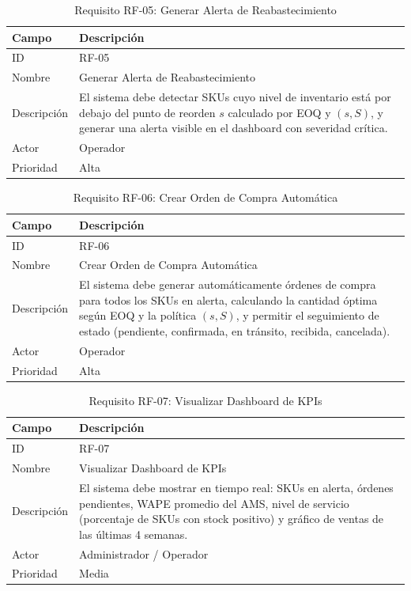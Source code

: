 \documentclass[12pt, a4paper]{report}
\begin{document}
\begin{table}[H]
  \centering
  \caption{Requisito RF-05: Generar Alerta de Reabastecimiento}
  \label{tab:rf05}
  \begin{tabular}{|l|p{9cm}|}
    \hline
    \textbf{Campo} & \textbf{Descripción} \\
    \hline
    ID          & RF-05 \\
    Nombre      & Generar Alerta de Reabastecimiento \\
    Descripción & El sistema debe detectar SKUs cuyo nivel de inventario está por
                  debajo del punto de reorden $s$ calculado por EOQ y $(s,S)$, y
                  generar una alerta visible en el dashboard con severidad crítica. \\
    Actor       & Operador \\
    Prioridad   & Alta \\
    \hline
  \end{tabular}
\end{table}

\begin{table}[H]
  \centering
  \caption{Requisito RF-06: Crear Orden de Compra Automática}
  \label{tab:rf06}
  \begin{tabular}{|l|p{9cm}|}
    \hline
    \textbf{Campo} & \textbf{Descripción} \\
    \hline
    ID          & RF-06 \\
    Nombre      & Crear Orden de Compra Automática \\
    Descripción & El sistema debe generar automáticamente órdenes de compra para
                  todos los SKUs en alerta, calculando la cantidad óptima según EOQ
                  y la política $(s,S)$, y permitir el seguimiento de estado
                  (pendiente, confirmada, en tránsito, recibida, cancelada). \\
    Actor       & Operador \\
    Prioridad   & Alta \\
    \hline
  \end{tabular}
\end{table}

\begin{table}[H]
  \centering
  \caption{Requisito RF-07: Visualizar Dashboard de KPIs}
  \label{tab:rf07}
  \begin{tabular}{|l|p{9cm}|}
    \hline
    \textbf{Campo} & \textbf{Descripción} \\
    \hline
    ID          & RF-07 \\
    Nombre      & Visualizar Dashboard de KPIs \\
    Descripción & El sistema debe mostrar en tiempo real: SKUs en alerta, órdenes
                  pendientes, WAPE promedio del AMS, nivel de servicio (porcentaje
                  de SKUs con stock positivo) y gráfico de ventas de las últimas
                  4 semanas. \\
    Actor       & Administrador / Operador \\
    Prioridad   & Media \\
    \hline
  \end{tabular}
\end{table}
\end{document}
